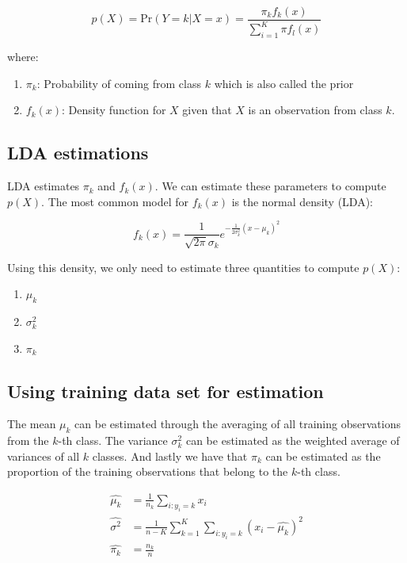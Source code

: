 \documentclass[twoside]{article}
\theoremstyle{definition}
\theoremstyle{definition}
\begin{document}
\begin{equation}
	p(X) = \text{Pr} (Y = k|X=x)  = \frac{\pi_k f_k(x)}{\sum^K_{i=1} \pi f_l(x)}
\end{equation}

where:

\begin{enumerate}
	\item $\pi_k$: Probability of coming from class $k$ which is also called the prior 
	\item $f_k(x)$: Density function for $X$ given that $X$ is an observation from class $k$.
\end{enumerate}

\subsection{LDA estimations}

LDA estimates $\pi_k$ and $f_k(x)$. We can estimate these parameters to compute $p(X)$. The most common model for $f_k(x)$ is the normal density (LDA):

\begin{equation}
	f_k(x) = \frac{1}{\sqrt{2\pi} \sigma_k}e^{-\frac{1}{2\sigma^2_k}(x-\mu_k)^2} 
\end{equation}

Using this density, we only need to estimate three quantities to compute $p(X)$: 

\begin{enumerate}
	\item $\mu_k$
	\item $\sigma^2_k$
	\item $\pi_k$
\end{enumerate}

\subsection{Using training data set for estimation}

The mean $\mu_k$ can be estimated through the averaging of all training observations from the $k$-th class. The variance $\sigma_k^2$ can be estimated as the weighted average of variances of all $k$ classes. And lastly we have that $\pi_k$ can be estimated as the proportion of the training observations that belong to the $k$-th class. 

\begin{align}
	\hat{\mu_k} & = \frac{1}{n_k} \sum_{i:y_i =k} x_i\\
	\hat{\sigma^2} & = \frac{1}{n-K} \sum^K_{k=1} \sum_{i:y_i = k} (x_i - \hat{\mu_k})^2\\
	\hat{\pi_k} & = \frac{n_k}{n}
\end{align}
\end{document}
